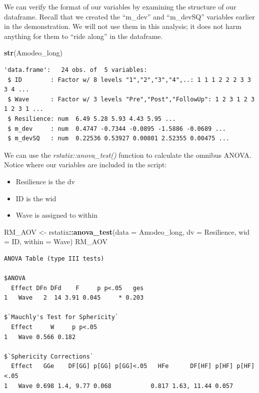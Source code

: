 \documentclass[
  11pt,
]{book}
\newenvironment{Shaded}{\begin{snugshade}}{\end{snugshade}}
\newcommand{\AttributeTok}[1]{\textcolor[rgb]{0.27,0.27,0.27}{#1}}
\newcommand{\FunctionTok}[1]{\textcolor[rgb]{0.27,0.27,0.27}{\textbf{#1}}}
\newcommand{\NormalTok}[1]{#1}
\newcommand{\OtherTok}[1]{\textcolor[rgb]{0.37,0.37,0.37}{#1}}
\newcommand{\SpecialCharTok}[1]{\textcolor[rgb]{0.43,0.43,0.43}{\textbf{#1}}}
\providecommand{\tightlist}{%
  \setlength{\itemsep}{0pt}\setlength{\parskip}{0pt}}
\begin{document}
We can verify the format of our variables by examining the structure of our dataframe. Recall that we created the ``m\_dev'' and ``m\_devSQ'' variables earlier in the demonstration. We will not use them in this analysis; it does not harm anything for them to ``ride along'' in the dataframe.

\begin{Shaded}
\begin{Highlighting}[]
\FunctionTok{str}\NormalTok{(Amodeo\_long)}
\end{Highlighting}
\end{Shaded}

\begin{verbatim}
'data.frame':   24 obs. of  5 variables:
 $ ID        : Factor w/ 8 levels "1","2","3","4",..: 1 1 1 2 2 2 3 3 3 4 ...
 $ Wave      : Factor w/ 3 levels "Pre","Post","FollowUp": 1 2 3 1 2 3 1 2 3 1 ...
 $ Resilience: num  6.49 5.28 5.93 4.43 5.95 ...
 $ m_dev     : num  0.4747 -0.7344 -0.0895 -1.5886 -0.0689 ...
 $ m_devSQ   : num  0.22536 0.53927 0.00801 2.52355 0.00475 ...
\end{verbatim}

We can use the \emph{rstatix::anova\_test()} function to calculate the omnibus ANOVA. Notice where our variables are included in the script:

\begin{itemize}
\tightlist
\item
  Resilience is the dv
\item
  ID is the wid
\item
  Wave is assigned to within
\end{itemize}

\begin{Shaded}
\begin{Highlighting}[]
\NormalTok{RM\_AOV }\OtherTok{\textless{}{-}}\NormalTok{ rstatix}\SpecialCharTok{::}\FunctionTok{anova\_test}\NormalTok{(}\AttributeTok{data =}\NormalTok{ Amodeo\_long, }\AttributeTok{dv =}\NormalTok{ Resilience, }\AttributeTok{wid =}\NormalTok{ ID,}
    \AttributeTok{within =}\NormalTok{ Wave)}
\NormalTok{RM\_AOV}
\end{Highlighting}
\end{Shaded}

\begin{verbatim}
ANOVA Table (type III tests)

$ANOVA
  Effect DFn DFd    F     p p<.05   ges
1   Wave   2  14 3.91 0.045     * 0.203

$`Mauchly's Test for Sphericity`
  Effect     W     p p<.05
1   Wave 0.566 0.182      

$`Sphericity Corrections`
  Effect   GGe    DF[GG] p[GG] p[GG]<.05   HFe      DF[HF] p[HF] p[HF]<.05
1   Wave 0.698 1.4, 9.77 0.068           0.817 1.63, 11.44 0.057          
\end{verbatim}
\end{document}
